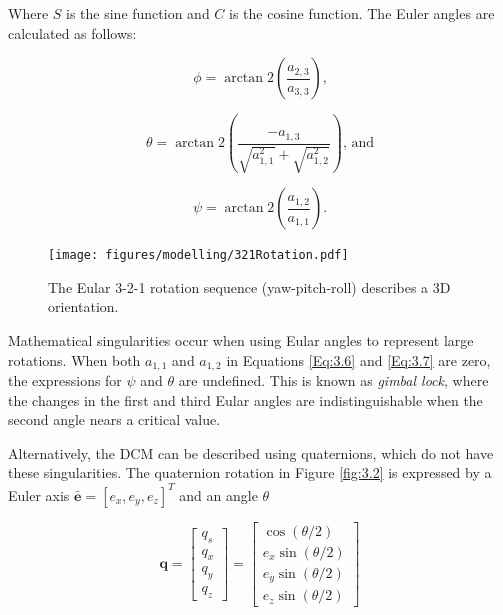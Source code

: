 \noindent Where $S$ is the sine function and $C$ is the cosine function. The Euler angles are calculated as follows:

\begin{equation}
    \phi = \arctan2\left(\frac{a_{2,3}}{a_{3,3}}\right) \text{,}
\end{equation}

\begin{equation}
    \theta = \arctan2\left(\frac{-a_{1,3}}{\sqrt{a_{1,1}^2} + \sqrt{a_{1,2}^2}}\right) \text{, and}
    \label{Eq:3.6}
\end{equation}

\begin{equation}
    \psi = \arctan2\left(\frac{a_{1,2}}{a_{1,1}}\right)
    \text{.}
    \label{Eq:3.7}
\end{equation}

\begin{figure}[H]
    \centering
    \texttt{[image: figures/modelling/321Rotation.pdf]}
    \caption{The Eular 3-2-1 rotation sequence (yaw-pitch-roll) describes a 3D orientation.}
    \label{fig:3.1}
\end{figure}

\noindent Mathematical singularities occur when using Eular angles to represent large rotations. When both $a_{1,1}$ and $a_{1,2}$ in Equations \ref{Eq:3.6} and \ref{Eq:3.7} are zero, 
the expressions for $\psi$ and $\theta$ are undefined. This is known as \textit{gimbal lock}, where the changes in the first and third Eular angles are 
indistinguishable when the second angle nears a critical value.
\vspace{0.5cm}

\noindent
Alternatively, the DCM can be described using quaternions, which do not have 
these singularities. The quaternion rotation in Figure \ref{fig:3.2} is expressed by a Euler axis
$\mathbf{\bar{e}}={[e_x,e_y,e_z]}^T$ and an angle $\theta$

\begin{equation}
    \mathbf{q} = \begin{bmatrix} q_s \\ q_x \\ q_y \\ q_z \end{bmatrix}
    = \begin{bmatrix} \cos(\theta/2) \\ e_x\sin(\theta/2) \\ e_y\sin(\theta/2) \\ e_z\sin(\theta/2) \end{bmatrix}
\end{equation}

